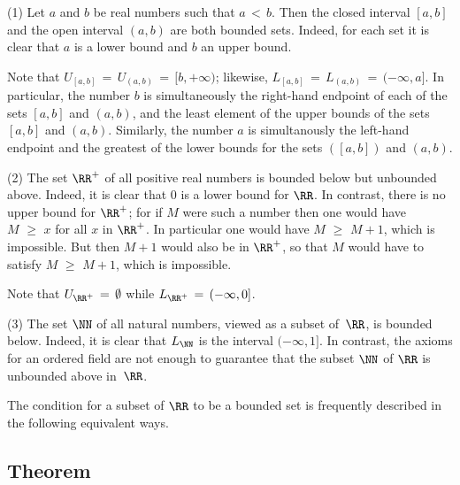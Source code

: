 \V

\hspace*{\parindent}(1) Let $a$ and $b$ be real numbers such that $a\,<\,b$.
    Then the closed interval $[a,b]$ and the open interval $(a,b)$ are both bounded sets.
    Indeed, for each set it is clear that $a$ is a lower bound and $b$ an upper bound.

        Note that $U_{[a,b]} \,=\, U_{(a,b)} \,=\, [b,+{\infty})$;
likewise, $L_{[a,b]} \,=\, L_{(a,b)} \,=\, (-{\infty},a]$.
    In particular, the number $b$ is simultaneously the right-hand endpoint of each of the sets $[a,b]$ and $(a,b)$,
    and the least element of the upper bounds of the sets $[a,b]$ and $(a,b)$.
    Similarly, the number $a$ is simultanously the left-hand endpoint and the greatest of the lower bounds for the sets $([a,b])$ and $(a,b)$.

\V

        (2) The set ${\RR}^{+}$ of all positive real numbers is bounded below but unbounded above.
    Indeed, it is clear that $0$ is a lower bound for ${\RR}$.
    In contrast, there is no upper bound for ${\RR}^{+}$; for if $M$ were such a number then one would have $M\,\,{\geq}\,\,x$ for all $x$ in ${\RR}^{+}$.
    In particular one would have $M\,\,{\geq}\,\,M+1$, which is impossible.
    But then $M+1$ would also be in ${\RR}^{+}$, so that $M$ would have to satisfy $M\,\,{\geq}\,\,M+1$, which is impossible.

        Note that $U_{{\RR}^{+}} \,=\, {\emptyset}$ while $L_{{\RR}^{+}} \,=\, (-{\infty},0]$.

\V

        (3) The set ${\NN}$ of all natural numbers, viewed as a subset of~${\RR}$, is bounded below.
    Indeed, it is clear that $L_{{\NN}}$ is the interval $(-{\infty},1]$. In contrast,
    the axioms for an ordered field are not enough to guarantee that the subset ${\NN}$ of ${\RR}$ is unbounded above in~${\RR}$.

\VV

        The condition for a subset of ${\RR}$ to be a bounded set is frequently described in the following equivalent ways.

\V

            \subsection{\small{\bf Theorem}}
            \label{ThmB30.25}

\VV

